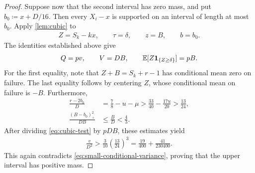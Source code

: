 \begin{proof}
Suppose now that the second interval has zero mass, and put $b_0\coloneqq x+D/16$.
Then every $X_i-x$ is supported on an interval of length at most $b_0$.
Apply \cref{lem:cubic} to
\begin{align*}
 Z=S_k-kx,
 \qquad \tau=\delta,
 \qquad z=B,
 \qquad b=b_0.
\end{align*}
The identities established above give
\begin{align*}
 Q=pv,\qquad V=DB,\qquad \mathbb E[Z\mathbf 1_{\{Z\ge\delta\}}]=pB.
\end{align*}
For the first equality, note that $Z+B=S_k+r-1$ has conditional mean zero on failure.
The last equality follows by centering $Z$, whose conditional mean on failure is $-B$.
Furthermore,
\begin{align*}
 \frac{r-2b_0}{D}
 &=\frac78-u-\mu
 >\frac{33}{40}-\frac{17u}{20}
 >\frac{13}{24},\\
 \frac{(B-b_0)_+^2}{DB}
 &\le\frac BD<\frac43.
\end{align*}
After dividing \cref{eq:cubic-test} by $pDB$, these estimates yield
\begin{align*}
 \frac v{D^2}
 >\frac3{10}\left(\frac{13}{24}\right)^3
 =\frac{19}{400}+\frac{41}{230400}.
\end{align*}
This again contradicts \cref{eq:small-conditional-variance}, proving that the upper interval has positive mass.
\end{proof}

